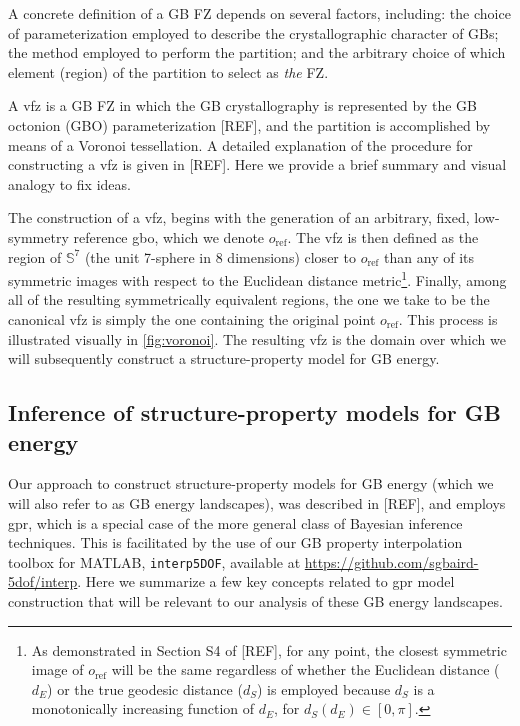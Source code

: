 \documentclass[final,twocolumn,12pt]{elsarticle}
\begin{document}
	A concrete definition of a GB FZ depends on several factors, including: the choice of parameterization employed to describe the crystallographic character of GBs; the method employed to perform the partition; and the arbitrary choice of which element (region) of the partition to select as \emph{the} FZ.
	
	A \gls{vfz} is a GB FZ in which the GB crystallography is represented by the GB octonion (GBO) parameterization [REF], and the partition is accomplished by means of a Voronoi tessellation. A detailed explanation of the procedure for constructing a \gls{vfz} is given in [REF]. Here we provide a brief summary and visual analogy to fix ideas.
	
	The construction of a \gls{vfz}, begins with the generation of an arbitrary, fixed, low-symmetry reference \gls{gbo}, which we denote $o_{\text{ref}}$. The \gls{vfz} is then defined as the region of $\mathbb{S}^7$ (the unit 7-sphere in 8 dimensions) closer to $o_{\text{ref}}$ than any of its symmetric images with respect to the Euclidean distance metric\footnote{As demonstrated in Section S4 of [REF], for any point, the closest symmetric image of $o_{\text{ref}}$ will be the same regardless of whether the Euclidean distance ($d_E$) or the true geodesic distance ($d_S$) is employed because $d_S$ is a monotonically increasing function of $d_E$, for $d_S\!\left(d_E\right) \in \left[0,\pi\right]$.\label{foot:monotonicity}}. Finally, among all of the resulting symmetrically equivalent regions, the one we take to be the canonical \gls{vfz} is simply the one containing the original point $o_{\text{ref}}$. This process is illustrated visually in \cref{fig:voronoi}. The resulting \gls{vfz} is the domain over which we will subsequently construct a structure-property model for GB energy.
	
	\subsection{Inference of structure-property models for GB energy}
	\label{sec:methods:inference}
	Our approach to construct structure-property models for GB energy (which we will also refer to as GB energy landscapes), was described in [REF], and employs \gls{gpr}, which is a special case of the more general class of Bayesian inference techniques. This is facilitated by the use of our GB property interpolation toolbox for MATLAB, \texttt{interp5DOF}, available at \url{https://github.com/sgbaird-5dof/interp}. Here we summarize a few key concepts related to \gls{gpr} model construction that will be relevant to our analysis of these GB energy landscapes.
	
\end{document}
